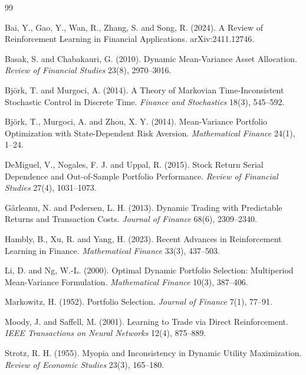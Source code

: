 \documentclass[11pt,a4paper]{article}
\theoremstyle{plain}
\theoremstyle{definition}
\theoremstyle{remark}
\begin{document}
\begin{thebibliography}{99}\small

 Bai, Y., Gao, Y., Wan, R., Zhang, S. and Song, R.
(2024). A Review of Reinforcement Learning in Financial Applications.
arXiv:2411.12746.

 Basak, S. and Chabakauri, G. (2010).
Dynamic Mean-Variance Asset Allocation. \emph{Review of Financial Studies}
23(8), 2970--3016.

 Björk, T. and Murgoci, A. (2014). A
Theory of Markovian Time-Inconsistent Stochastic Control in Discrete Time.
\emph{Finance and Stochastics} 18(3), 545--592.

 Björk, T., Murgoci, A. and Zhou, X. Y.
(2014). Mean-Variance Portfolio Optimization with State-Dependent Risk Aversion.
\emph{Mathematical Finance} 24(1), 1--24.

 DeMiguel, V., Nogales, F. J. and Uppal, R.
(2015). Stock Return Serial Dependence and Out-of-Sample Portfolio Performance.
\emph{Review of Financial Studies} 27(4), 1031--1073.

 Gârleanu, N. and Pedersen, L. H.
(2013). Dynamic Trading with Predictable Returns and Transaction Costs.
\emph{Journal of Finance} 68(6), 2309--2340.

 Hambly, B., Xu, R. and Yang, H. (2023).
Recent Advances in Reinforcement Learning in Finance. \emph{Mathematical Finance}
33(3), 437--503.

 Li, D. and Ng, W.-L. (2000). Optimal Dynamic
Portfolio Selection: Multiperiod Mean-Variance Formulation. \emph{Mathematical
Finance} 10(3), 387--406.

 Markowitz, H. (1952). Portfolio Selection.
\emph{Journal of Finance} 7(1), 77--91.

 Moody, J. and Saffell, M. (2001).
Learning to Trade via Direct Reinforcement. \emph{IEEE Transactions on Neural
Networks} 12(4), 875--889.

 Strotz, R. H. (1955). Myopia and Inconsistency in
Dynamic Utility Maximization. \emph{Review of Economic Studies} 23(3), 165--180.


\end{thebibliography}
\end{document}
